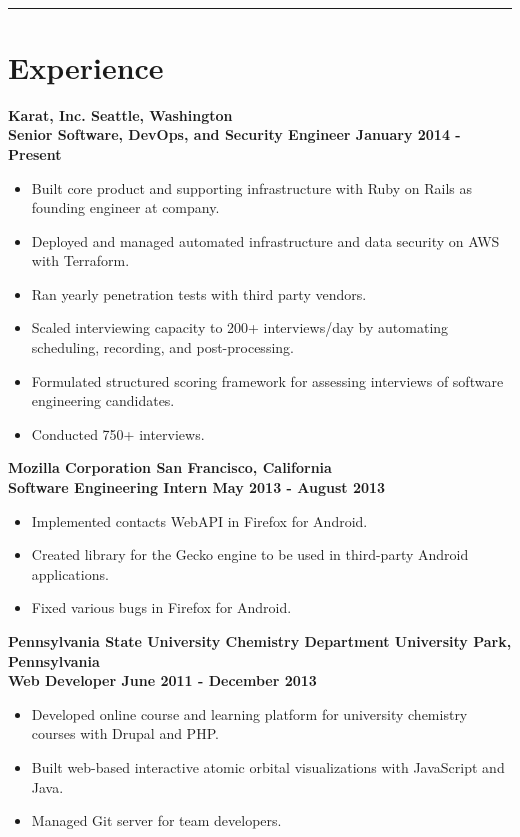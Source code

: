 \documentclass[letterpaper]{article}
\newcommand{\setfontsize}{\fontsize{11.5}{16}\selectfont}
\newcommand{\sectionrule}[1] {
  \noindent\rule{\textwidth}{.1mm}
  \vspace{-11mm}
  \section{#1}
}
\newenvironment{indentsection}
  {\begin{adjustwidth}{10mm}{0pt}}
  {\end{adjustwidth}}
\newcommand{\job}[5] {
  \noindent\textbf{#1 \hfill #2}\\
  \textbf{#3 \hfill #4 - #5}

  \vspace{1mm}
}
\begin{document}
  \setfontsize

  \vspace{2mm}\\

  \sectionrule{Experience}

  \begin{indentsection}
    \job{Karat, Inc.}{Seattle, Washington}{Senior Software, DevOps, and Security Engineer}{January 2014}{Present}
    \begin{itemize}
      \item Built core product and supporting infrastructure with Ruby on Rails as founding engineer at company.
      \item Deployed and managed automated infrastructure and data security on AWS with Terraform.
      \item Ran yearly penetration tests with third party vendors.
      \item Scaled interviewing capacity to 200+ interviews/day by automating scheduling, recording, and post-processing.
      \item Formulated structured scoring framework for assessing interviews of software engineering candidates.
      \item Conducted 750+ interviews.
    \end{itemize}

    \vspace{3mm}

    \job{Mozilla Corporation}{San Francisco, California}{Software Engineering Intern}{May 2013}{August 2013}
    \begin{itemize}
      \item Implemented contacts WebAPI in Firefox for Android.
      \item Created library for the Gecko engine to be used in third-party Android applications.
      \item Fixed various bugs in Firefox for Android.
    \end{itemize}

    \vspace{3mm}

    \job{Pennsylvania State University Chemistry Department}{University Park, Pennsylvania}{Web Developer}{June 2011}{December 2013}
    \begin{itemize}
      \item Developed online course and learning platform for university chemistry courses with Drupal and PHP.
      \item Built web-based interactive atomic orbital visualizations with JavaScript and Java.
      \item Managed Git server for team developers.
    \end{itemize}
  \end{indentsection}
\end{document}
